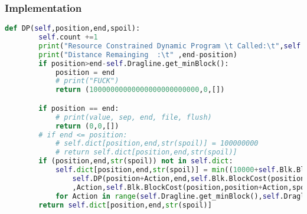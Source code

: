 \subsubsection{Implementation}
\begin{lstlisting}[language = python]
	def DP(self,position,end,spoil):
		self.count +=1
		print("Resource Constrained Dynamic Program \t Called:\t",self.count,'  times')
		print("Distance Remainging  :\t" ,end-position)
		if position>end-self.Dragline.get_minBlock():
			position = end
			# print("FUCK")
			return (10000000000000000000000000,0,[])

		if position == end:
			# print(value, sep, end, file, flush)
			return (0,0,[])
		# if end <= position:
			# self.dict[position,end,str(spoil)] = 100000000
			# return self.dict[position,end,str(spoil)]
		if (position,end,str(spoil)) not in self.dict:
			self.dict[position,end,str(spoil)] = min((10000+self.Blk.BlockCost(position,position+Action,spoil)[0]+
				self.DP(position+Action,end,self.Blk.BlockCost(position,position+Action,spoil)[1])[0]
				,Action,self.Blk.BlockCost(position,position+Action,spoil)[1])
			for Action in range(self.Dragline.get_minBlock(),self.Dragline.get_maxBlock()))
		return self.dict[position,end,str(spoil)]

\end{lstlisting}
